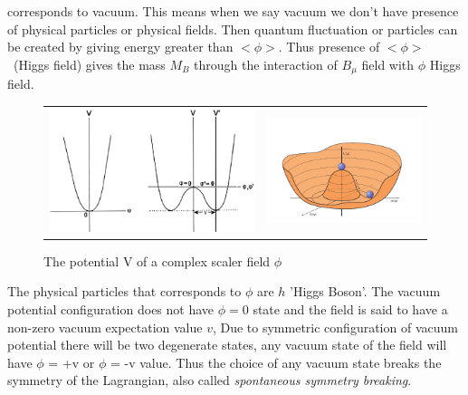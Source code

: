 corresponds to vacuum. This means when we say vacuum we don't have presence of physical particles or physical fields. Then quantum fluctuation or particles can be created by  giving energy greater than $<\phi>$. Thus presence of $<\phi>$~(Higgs field) gives the mass $M_{B}$ through the interaction of $B_{\mu}$ field with $\phi$ Higgs field.
\begin{figure}[h!]
\begin{tabular}{cc}
\includegraphics[scale=0.3]{chapter1/Symmetry breaking.png}
&
\includegraphics[scale=0.5]{chapter1/sym_break.png}
\end{tabular}

\caption{The potential V of a complex scaler field $\phi$~\cite{Ellis_2016}}
\end{figure}
The physical particles that corresponds to $\phi$ are $h$ 'Higgs Boson'. The vacuum potential configuration does not have $\phi = 0$ state and the field is said to have a non-zero vacuum expectation value $v$, Due to symmetric configuration of vacuum potential there will be two degenerate states, any vacuum state of the field will have $\phi$ = +v or $\phi$ = -v value. Thus the choice of any vacuum state breaks the symmetry of the Lagrangian, also called \textit{spontaneous symmetry breaking}.
